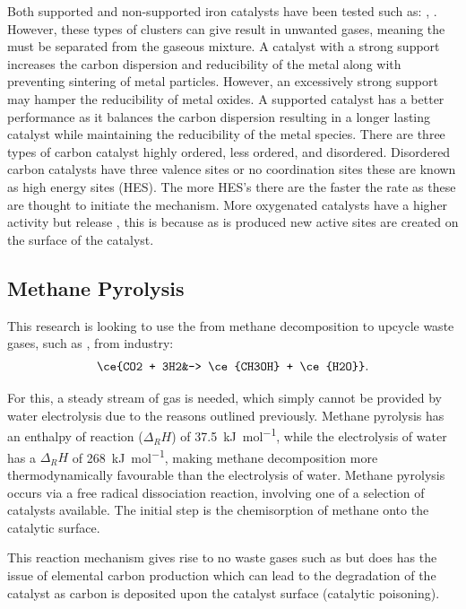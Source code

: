 \begin{multicols}{2}

Both supported and non-supported iron catalysts have been tested such as: \ce{[Fe(CO)5]},  \ce{[Fe(cp)2]}.
However, these types of clusters can give result in unwanted gases, meaning the  must be separated from the gaseous mixture.
A catalyst with a strong support increases the carbon dispersion and reducibility of the metal along with preventing sintering of metal particles.
However, an excessively strong support may hamper the reducibility of metal oxides.
A supported catalyst has a better performance as it balances the carbon dispersion resulting in a longer lasting catalyst while maintaining the reducibility of the metal species.
There are three types of carbon catalyst highly ordered, less ordered, and disordered.
Disordered carbon catalysts have three valence sites or no coordination sites these are known as high energy sites (HES).
The more HES’s there are the faster the rate as these are thought to initiate the mechanism.
More oxygenated catalysts have a higher activity but release , this is because as  is produced new active sites are created on the surface of the catalyst.


\subsection{Methane Pyrolysis}%
\label{sub:methane_pyrolysis}
This research is looking to use the  from methane decomposition to upcycle waste gases, such as , from industry:
\begin{align}
	\ce{CO2 + 3H2&-> \ce{CH3OH} + \ce{H2O}}
.\end{align}

For this, a steady stream of  gas is needed, which simply cannot be provided by water electrolysis due to the reasons outlined previously.
Methane pyrolysis has an enthalpy of reaction ($\Delta_RH$) of \SI{+37.5}{\kilo\joule\per\mole}, while the electrolysis of water has a $\Delta_RH$ of \SI{+268}{\kilo\joule\per\mole}, making methane decomposition more thermodynamically favourable than the electrolysis of water.
Methane pyrolysis occurs via a free radical dissociation reaction, involving one of a selection of catalysts available.
The initial step is the chemisorption of methane onto the catalytic surface.


This reaction mechanism gives rise to no waste gases such as  but does has the issue of elemental carbon production which can lead to the degradation of the catalyst as carbon is deposited upon the catalyst surface (catalytic poisoning).


\end{multicols}
